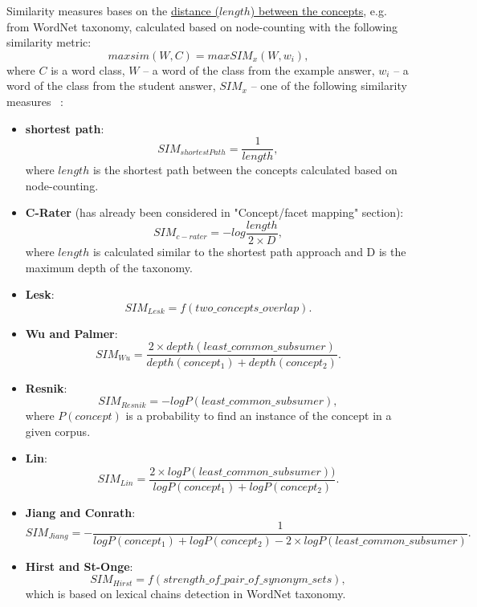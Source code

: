 Similarity measures bases on the \underline{distance ($length$) between the concepts}, e.g. from WordNet taxonomy, calculated based on node-counting with the following similarity metric:	\begin{equation} \label{eq:maxsim}
	maxsim(W,C) = max SIM_x(W,w_i),
	\end{equation}
where $C$ is a word class, $W$ -- a word of the class from the example answer, $w_i$ -- a word of the class from the student answer, $SIM_x$ -- one of the 		following similarity measures ~\cite{Mohler}:
\begin{itemize}
\item \textbf{shortest path}:
\begin{equation} \label{eq:shortestPath}
SIM_{shortestPath} = \frac{1}{length},
\end{equation}
where $length$ is the shortest path between the concepts calculated based on node-counting.
\item \textbf{C-Rater} (has already been considered in "Concept/facet mapping" section):
\begin{equation} \label{eq:c-rater}
SIM_{c-rater} = -log \frac{length}{2 \times D},
\end{equation}
where $length$ is calculated similar to the shortest path approach and D is the maximum depth of the taxonomy.
\item \textbf{Lesk}:
\begin{equation} \label{eq:Lesk}
SIM_{Lesk} = f(two\_concepts\_overlap).
\end{equation}
\item \textbf{Wu and Palmer}:
\begin{equation} \label{eq:Wu}
SIM_{Wu} = \frac{2 \times depth(least\_common\_subsumer)}{depth(concept_1) + depth(concept_2)}.
\end{equation}
\item \textbf{Resnik}:
\begin{equation} \label{eq:Resnik}
SIM_{Resnik} = -log P(least\_common\_subsumer),
\end{equation}
where $P(concept)$ is a probability to find an instance of the concept in a given corpus.
\item \textbf{Lin}:
\begin{equation} \label{eq:Lin}
SIM_{Lin} = \frac{2 \times log P(least\_common\_subsumer))}{log P(concept_1) + log P(concept_2)}.
\end{equation}
\item \textbf{Jiang and Conrath}:
\begin{equation} \label{eq:Jiang}
SIM_{Jiang} = - \frac{1}{log P(concept_1) + log P(concept_2) - 2 \times log P(least\_common\_subsumer) }.
\end{equation}
\item \textbf{Hirst and St-Onge}:
\begin{equation} \label{eq:Hirst}
SIM_{Hirst} = f(strength\_of\_pair\_of\_synonym\_sets),
\end{equation}
which is based on lexical chains detection in WordNet taxonomy.
\end{itemize}

